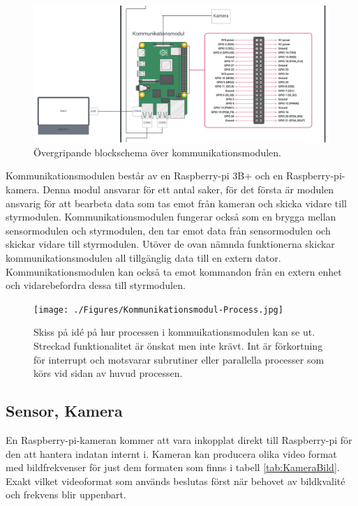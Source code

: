 \documentclass[10pt,oneside,swedish]{lips}
\begin{document}
\begin{figure}[htbp]
  \centering
  \includegraphics[width=1\textwidth]{./Figures/detalj_kommunikationsmodul.png}
  \caption{Övergripande blockschema över kommunikationsmodulen.}
  \label{fig:detalj_kommunikationsmodul.png}
\end{figure}

Kommunikationsmodulen består av en Raspberry-pi 3B+ och en Raspberry-pi-kamera. Denna modul ansvarar för ett antal saker, för det första är modulen ansvarig för att bearbeta data som tas emot från kameran och skicka vidare till styrmodulen. 
Kommunikationsmodulen fungerar också som en brygga mellan sensormodulen och styrmodulen, den tar emot data från sensormodulen och skickar vidare till styrmodulen.
Utöver de ovan nämnda funktionerna skickar kommunikationsmodulen all tillgänglig data till en extern dator. Kommunikationsmodulen kan också ta emot kommandon från en extern enhet och vidarebefordra dessa till styrmodulen.


\begin{figure}[htbp]
  \centering
  \texttt{[image: ./Figures/Kommunikationsmodul-Process.jpg]}
  \caption{Skiss på idé på hur processen i kommuikationsmodulen kan se ut. Streckad funktionalitet är önskat men inte krävt. Int är förkortning för interrupt och motsvarar subrutiner eller parallella processer som körs vid sidan av huvud processen.}
  \label{fig:kommunikationsmodul-process}
\end{figure}

\pagebreak
\subsection{Sensor, Kamera}
En Raspberry-pi-kameran kommer att vara inkopplat direkt till Raspberry-pi för den att hantera indatan internt i. Kameran kan producera olika video format med bildfrekvenser för just dem formaten som finns i tabell \ref{tab:KameraBild}. Exakt vilket videoformat som används beslutas först när behovet av bildkvalité och frekvens blir uppenbart. 
\end{document}
